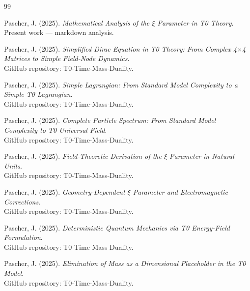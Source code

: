 	\begin{thebibliography}{99}
		
		Pascher, J. (2025). \textit{Mathematical Analysis of the $\xi$ Parameter in T0 Theory}. \\
		Present work --- markdown analysis.
		
		Pascher, J. (2025). \textit{Simplified Dirac Equation in T0 Theory: From Complex 4$\times$4 Matrices to Simple Field-Node Dynamics}. \\
		GitHub repository: T0-Time-Mass-Duality.
		
		Pascher, J. (2025). \textit{Simple Lagrangian: From Standard Model Complexity to a Simple T0 Lagrangian}. \\
		GitHub repository: T0-Time-Mass-Duality.
		
		Pascher, J. (2025). \textit{Complete Particle Spectrum: From Standard Model Complexity to T0 Universal Field}. \\
		GitHub repository: T0-Time-Mass-Duality.
		
		Pascher, J. (2025). \textit{Field-Theoretic Derivation of the $\xi$ Parameter in Natural Units}. \\
		GitHub repository: T0-Time-Mass-Duality.
		
		Pascher, J. (2025). \textit{Geometry-Dependent $\xi$ Parameter and Electromagnetic Corrections}. \\
		GitHub repository: T0-Time-Mass-Duality.
		
		Pascher, J. (2025). \textit{Deterministic Quantum Mechanics via T0 Energy-Field Formulation}. \\
		GitHub repository: T0-Time-Mass-Duality.
		
		Pascher, J. (2025). \textit{Elimination of Mass as a Dimensional Placeholder in the T0 Model}. \\
		GitHub repository: T0-Time-Mass-Duality.
		
	\end{thebibliography}

